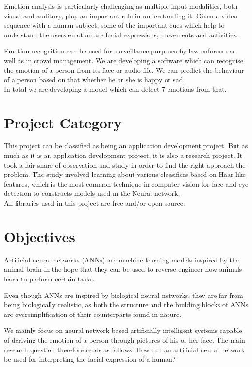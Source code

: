 Emotion analysis is particularly challenging as multiple input modalities, both visual and auditory, play an important role in understanding it. Given a video sequence with a human subject, some of the important cues which help to understand the users emotion are facial expressions, movements and activities.

Emotion recognition can be used for surveillance purposes by law enforcers as well as in crowd management. We are developing a software which can recognise the emotion of a person from its face or audio file. We can predict the behaviour of a person based on that whether he or she is happy or sad.\\
In total we are developing a model which can detect 7 emotions from that.

\section{Project Category}
This project can be classified as being an application development project. But as much as it is an application development project, it is also a research project. It took a fair share of observation and study in order to find the right approach the problem. The study involved learning about various classifiers based on Haar-like features, which is the most common technique in computer-vision for face and eye detection to constructs models used in the Neural network.
\\
All libraries used in this project are free and/or open-source.

\section{Objectives}
Artificial neural networks (ANNs) are machine learning models inspired by the animal brain in the hope that they can be used to reverse engineer how animals learn to perform certain tasks.

Even though ANNs are inspired by biological neural networks, they are far from being biologically realistic, as both the structure and the building blocks of ANNs are oversimplification of their counterparts found in nature.

We mainly focus on neural network based artificially intelligent systems capable of deriving the emotion of a person through pictures of his or her face. The main research question therefore reads as follows: How can an artificial neural network be used for interpreting the facial expression of a human?

